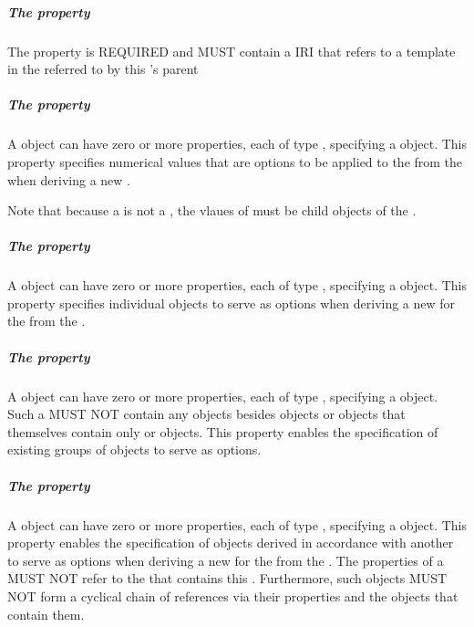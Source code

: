 \subparagraph{The  property}\label{sec:variable}

The  property is REQUIRED and MUST contain a IRI that refers to a template  in the   referred to by this 's parent 

\subparagraph{The  property}\label{sec:variantMeasure}

A  object can have zero or more  properties, each of type , specifying a  object. This property specifies numerical values that are options to be applied to the   from the  when deriving a new .

Note that because a  is not a , the vlaues of  must be child objects of the .

\subparagraph{The  property}\label{sec:variant}

A  object can have zero or more  properties, each of type , specifying a  object. This property specifies individual  objects to serve as options when deriving a new  for the   from the .

\subparagraph{The  property}\label{sec:variantCollection}

A  object can have zero or more  properties, each of type , specifying a  object.
Such a  MUST NOT contain any objects besides  objects or  objects that themselves contain only  or  objects.
This property enables the specification of existing groups of  objects to serve as options.

\subparagraph{The  property}\label{sec:variantDerivation}

A  object can have zero or more  properties, each of type , specifying a  object. 
This property enables the specification of  objects derived in accordance with another  to serve as options when deriving a new  for the   from the . 
The  properties of a  MUST NOT refer to the  that contains this . 
Furthermore, such  objects MUST NOT form a cyclical chain of references via their  properties and the  objects that contain them. 

